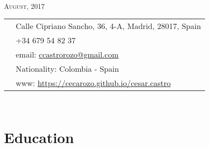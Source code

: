 \documentclass[11pt]{article}\usepackage[]{graphicx}\usepackage[]{color}
\begin{document}
\par{\\
\vspace{5pt}
{\color{headings} \scshape{August, 2017}}\\
\vspace{10pt}}

\colorbox{shade}{{
\begin{tabular}{c|p{13cm}}
\vspace{5pt}\raisebox{-4pt}{\textifsymbol{18}} & Calle Cipriano Sancho, 36, 4-A, Madrid, 28017, Spain\\
\vspace{5pt}\raisebox{-4pt}{\Mobilefone} & +34 679 54 82 37\\
\vspace{5pt}\raisebox{-4pt}{\Letter} & email: \href{mailto:ccastrorozo@gmail.com}{ccastrorozo@gmail.com} \\
\vspace{5pt}\raisebox{-4pt}{\Aquarius} & Nationality: Colombia - Spain\\
\vspace{5pt}\raisebox{-4pt}{\Mundus} & www: \href{https://cecarozo.github.io/cesar.castro}{https://cecarozo.github.io/cesar.castro}\\
\end{tabular}
}
}\\[10pt]


\section{Education} 
\end{document}
